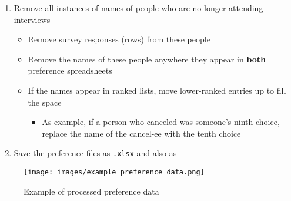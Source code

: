 \begin{enumerate}
\begin{itemize}
		\end{itemize}
	\item Remove all instances of names of people who are no longer attending interviews
		\begin{itemize}
			\item Remove survey responses (rows) from these people
			\item Remove the names of these people anywhere they appear in \textbf{both} preference spreadsheets
			\item If the names appear in ranked lists, move lower-ranked entries up to fill the space
				\begin{itemize}
					\item As example, if a person who canceled was someone's ninth choice, replace the name of the cancel-ee with the tenth choice
				\end{itemize}
		\end{itemize}
	\item Save the preference files as \texttt{.xlsx} and also as 
			
	
			
			
\end{enumerate}


\begin{figure}
	\centering
	\texttt{[image: images/example\_preference\_data.png]}
	\caption{\label{fig:example_preference_data} Example of processed preference data}
\end{figure}

